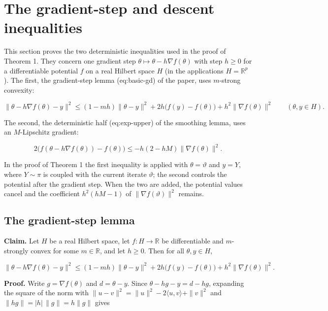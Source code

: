 \documentclass[11pt,a4paper]{report}
\begin{document}
\section{\texorpdfstring{The gradient-step and descent inequalities}{The gradient-step and descent inequalities}}
\label{proof-module-AverageLMC-GradientStep-lean}


This section proves the two deterministic inequalities used in the proof of Theorem 1. They concern one gradient step \(\theta\mapsto\theta-h\nabla f(\theta)\) with step \(h\ge0\) for a differentiable potential \(f\) on a real Hilbert space \(H\) (in the applications \(H=\mathbb R^p\)). The first, the gradient-step lemma (eq:basic-gd) of the paper, uses \(m\)-strong convexity:


\[\|\theta-h\nabla f(\theta)-y\|^2\le(1-mh)\|\theta-y\|^2+2h\bigl(f(y)-f(\theta)\bigr)+h^2\|\nabla f(\theta)\|^2\qquad(\theta,y\in H).\]


The second, the deterministic half (eq:exp-upper) of the smoothing lemma, uses an \(M\)-Lipschitz gradient:


\[2\bigl(f(\theta-h\nabla f(\theta))-f(\theta)\bigr)\le-h(2-hM)\|\nabla f(\theta)\|^2.\]


In the proof of Theorem 1 the first inequality is applied with \(\theta=\vartheta\) and \(y=Y\), where \(Y\sim\pi\) is coupled with the current iterate \(\vartheta\); the second controls the potential after the gradient step. When the two are added, the potential values cancel and the coefficient \(h^2(hM-1)\) of \(\|\nabla f(\vartheta)\|^2\) remains.

\subsection{\texorpdfstring{The gradient-step lemma}{The gradient-step lemma}}
\label{report-step-AverageLMC-GradientStep-lean-1}


\textbf{Claim.} Let \(H\) be a real Hilbert space, let \(f:H\to\mathbb R\) be differentiable and \(m\)-strongly convex for some \(m\in\mathbb R\), and let \(h\ge0\). Then for all \(\theta,y\in H\),


\[\|\theta-h\nabla f(\theta)-y\|^2\le(1-mh)\|\theta-y\|^2+2h\bigl(f(y)-f(\theta)\bigr)+h^2\|\nabla f(\theta)\|^2.\]


\textbf{Proof.} Write \(g=\nabla f(\theta)\) and \(d=\theta-y\). Since \(\theta-hg-y=d-hg\), expanding the square of the norm with \(\|u-v\|^2=\|u\|^2-2\langle u,v\rangle+\|v\|^2\) and \(\|hg\|=|h|\,\|g\|=h\|g\|\) gives
\end{document}
